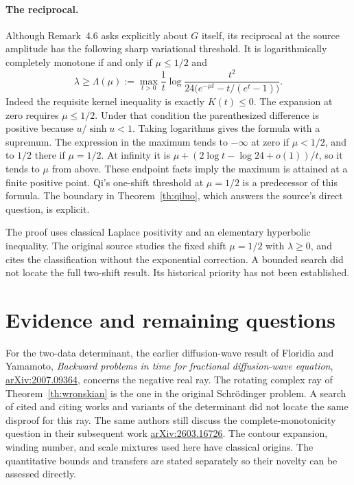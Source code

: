 \documentclass[11pt,a4paper]{article}
\numberwithin{equation}{section}
\begin{document}
\paragraph{The reciprocal.}
Although Remark~4.6 asks explicitly about $G$ itself, its reciprocal
at the source amplitude has the following sharp variational threshold.
It is logarithmically completely monotone if and only if $\mu\le1/2$
and
\[
 \lambda\ge\Lambda(\mu):=
 \max_{t>0}\frac1t
     \log\frac{t^2}{24\bigl(e^{-\mu t}-t/(e^t-1)\bigr)}.
\]
Indeed the requisite kernel inequality is exactly $K(t)\le0$.
The expansion at zero requires $\mu\le1/2$. Under that condition
the parenthesized difference is positive because $u/\sinh u<1$.
Taking logarithms gives the formula with a supremum. The expression
in the maximum tends to $-\infty$ at zero if $\mu<1/2$, and to $1/2$
there if $\mu=1/2$. At infinity it is
$\mu+(2\log t-\log 24+o(1))/t$, so it tends to $\mu$ from above.
These endpoint facts imply the maximum is attained at a finite
positive point. Qi's one-shift threshold at $\mu=1/2$ is a predecessor
of this formula. The boundary in Theorem~\ref{th:qiluo}, which answers
the source's direct question, is explicit.

The proof uses classical Laplace positivity and an elementary
hyperbolic inequality. The original source studies the fixed shift
$\mu=1/2$ with $\lambda\ge0$, and cites the classification without
the exponential correction. A bounded search did not locate the
full two-shift result. Its historical priority has not been established.



\section{Evidence and remaining questions}
For the two-data determinant, the earlier diffusion-wave result of
Floridia and Yamamoto, \emph{Backward problems in time for fractional
diffusion-wave equation},
\href{https://arxiv.org/abs/2007.09364}{arXiv:2007.09364}, concerns
the negative real ray. The rotating complex ray of
Theorem~\ref{th:wronskian} is the one in the original
Schr\"odinger problem. A search of cited and citing works and variants
of the determinant did not locate the same disproof for this ray.
The same authors still discuss the complete-monotonicity question in
their subsequent work \href{https://arxiv.org/abs/2603.16726}{arXiv:2603.16726}.
The contour expansion, winding number, and scale mixtures used here
have classical origins. The quantitative bounds and transfers are
stated separately so their novelty can be assessed directly.
\end{document}
